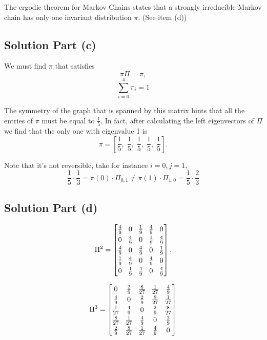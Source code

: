 The ergodic theorem for Markov Chains states that a strongly irreducible Markov chain has only one invariant distribution $\pi$. (See item (d))

\subsection*{Solution Part (c)}

We must find $\pi$ that satisfies 
\[ \pi \Pi = \pi, \]
\[ \sum_{i = 0}^4 \pi_i = 1 \]

The symmetry of the graph that is spanned by this matrix hints that all the entries of $\pi$ must be equal to $\frac{1}{5}$. In fact, after calculating the left eigenvectors of $\Pi$ we find that the only one with eigenvalue 1 is 
\[ \pi = \left[ \frac{1}{5},\; \frac{1}{5},\;\frac{1}{5},\;\frac{1}{5},\;\frac{1}{5} \right]. \]

Note that it's not reversible, take for instance $i = 0, j = 1$,
\[ \frac{1}{5} \cdot \frac{1}{3} = \pi(0) \cdot \Pi_{0,1} \neq \pi(1) \cdot \Pi_{1,0} = \frac{1}{5} \cdot \frac{2}{3} \]

\subsection*{Solution Part (d)}

\[ \arraycolsep=4pt\def\arraystretch{1.2}
\Pi^2 = \left[\begin{matrix}\frac{4}{9} & 0 & \frac{1}{9} & \frac{4}{9} & 0\\0 & \frac{4}{9} & 0 & \frac{1}{9} & \frac{4}{9}\\\frac{4}{9} & 0 & \frac{4}{9} & 0 & \frac{1}{9}\\\frac{1}{9} & \frac{4}{9} & 0 & \frac{4}{9} & 0\\0 & \frac{1}{9} & \frac{4}{9} & 0 & \frac{4}{9}\end{matrix}\right],\]

\[ \arraycolsep=4pt\def\arraystretch{1.2}
\Pi^3 = \left[\begin{matrix}0 & \frac{2}{9} & \frac{8}{27} & \frac{1}{27} & \frac{4}{9}\\\frac{4}{9} & 0 & \frac{2}{9} & \frac{8}{27} & \frac{1}{27}\\\frac{1}{27} & \frac{4}{9} & 0 & \frac{2}{9} & \frac{8}{27}\\\frac{8}{27} & \frac{1}{27} & \frac{4}{9} & 0 & \frac{2}{9}\\\frac{2}{9} & \frac{8}{27} & \frac{1}{27} & \frac{4}{9} & 0\end{matrix}\right]\]

